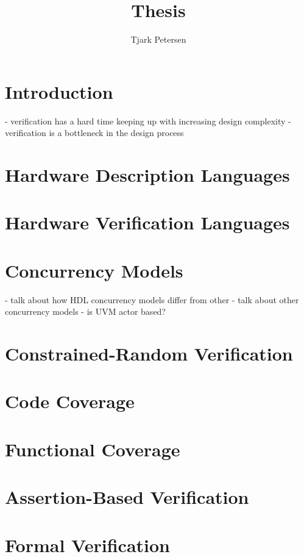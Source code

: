 \documentclass[11pt]{article}
\author{Tjark Petersen}
\title{Thesis}
\begin{document}
\maketitle

\section{Introduction}

- verification has a hard time keeping up with increasing design complexity
- verification is a bottleneck in the design process

\section{Hardware Description Languages}

\section{Hardware Verification Languages}

\section{Concurrency Models}
- talk about how HDL concurrency models differ from other
- talk about other concurrency models
- is UVM actor based?

\section{Constrained-Random Verification}

\cite{Mehta2021}

\section{Code Coverage}

\section{Functional Coverage}

\section{Assertion-Based Verification}

\section{Formal Verification}
\end{document}
